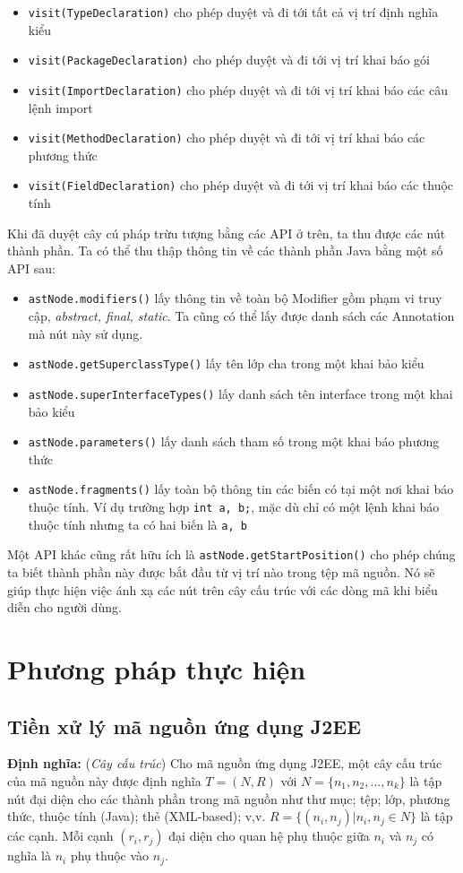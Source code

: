 \documentclass[12pt]{report}
\begin{document}
\begin{itemize}
	\item \texttt{visit(TypeDeclaration)} cho phép duyệt và đi tới tất cả vị trí định nghĩa kiểu
	\item \texttt{visit(PackageDeclaration)} cho phép duyệt và đi tới vị trí khai báo gói
	\item \texttt{visit(ImportDeclaration)} cho phép duyệt và đi tới vị trí khai báo các câu lệnh import
	\item \texttt{visit(MethodDeclaration)} cho phép duyệt và đi tới vị trí khai báo các phương thức
	\item \texttt{visit(FieldDeclaration)} cho phép duyệt và đi tới vị trí khai báo các thuộc tính
\end{itemize}

Khi đã duyệt cây cú pháp trừu tượng bằng các API ở trên, ta thu được các nút thành phần. Ta có thể thu thập thông tin về các thành phần Java bằng một số API sau:
\begin{itemize}
	\item \texttt{astNode.modifiers()} lấy thông tin về toàn bộ Modifier gồm phạm vi truy cập, \textit{abstract, final, static}. Ta cũng có thể lấy được danh sách các Annotation mà nút này sử dụng.
	\item \texttt{astNode.getSuperclassType()} lấy tên lớp cha trong một khai bảo kiểu
	\item \texttt{astNode.superInterfaceTypes()} lấy danh sách tên interface trong một khai bảo kiểu
	\item \texttt{astNode.parameters()} lấy danh sách tham số trong một khai báo phương thức
	\item \texttt{astNode.fragments()} lấy toàn bộ thông tin các biến có tại một nơi khai báo thuộc tính. Ví dụ trường hợp \texttt{int a, b;}, mặc dù chỉ có một lệnh khai báo thuộc tính nhưng ta có hai biến là \texttt{a, b}
\end{itemize}

Một API khác cũng rất hữu ích là \texttt{astNode.getStartPosition()} cho phép chúng ta biết thành phần này được bắt đầu từ vị trí nào trong tệp mã nguồn. Nó sẽ giúp thực hiện việc ánh xạ các nút trên cây cấu trúc với các dòng mã khi biểu diễn cho người dùng.

\newpage
\chapter{Phương pháp thực hiện}
\label{chap:approach}
\section{Tiền xử lý mã nguồn ứng dụng J2EE}
\textbf{Định nghĩa:} (\textit{Cây cấu trúc}\cite{jcia}) Cho mã nguồn ứng dụng J2EE, một cây cấu trúc của mã nguồn này được định nghĩa $T = (N, R)$ với $N = \{n_1, n_2,..., n_k\}$ là tập nút đại diện cho các thành phần trong mã nguồn như thư mục; tệp; lớp, phương thức, thuộc tính (Java); thẻ (XML-based); v,v. $R = \{(n_i, n_j) | n_i,n_j \in N\}$ là tập các cạnh. Mỗi cạnh $(r_i,r_j)$ đại diện cho quan hệ phụ thuộc giữa $n_i$ và $n_j$ có nghĩa là $n_i$ phụ thuộc vào $n_j$.
\end{document}
